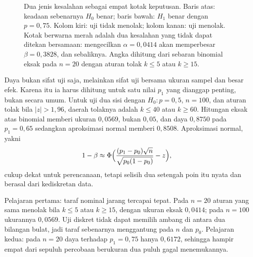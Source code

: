 \begin{figure}[htbp]
\centering
{}
\caption{Dua jenis kesalahan sebagai empat kotak keputusan. Baris atas: keadaan
sebenarnya $H_0$ benar; baris bawah: $H_1$ benar dengan $p=0{,}75$. Kolom kiri: uji
tidak menolak; kolom kanan: uji menolak. Kotak berwarna merah adalah dua kesalahan yang
tidak dapat ditekan bersamaan: mengecilkan $\alpha=0{,}0414$ akan memperbesar
$\beta=0{,}3828$, dan sebaliknya. Angka dihitung dari sebaran binomial eksak pada
$n=20$ dengan aturan tolak $k\le5$ atau $k\ge15$.}
\label{fig:dua-galat}
\end{figure}

Daya bukan sifat uji saja, melainkan sifat uji bersama ukuran sampel dan besar efek.
Karena itu ia harus dihitung untuk satu nilai $p_1$ yang dianggap penting, bukan
secara umum. Untuk uji dua sisi dengan $H_0\colon p=0{,}5$, $n=100$, dan aturan tolak
bila $|z|>1{,}96$, daerah tolaknya adalah $k\le40$ atau $k\ge60$. Hitungan eksak atas
binomial memberi ukuran $0{,}0569$, bukan $0{,}05$, dan daya $0{,}8750$ pada
$p_1=0{,}65$ sedangkan aproksimasi normal memberi $0{,}8508$. Aproksimasi normal,
yakni
\[
1-\beta\approx\Phi\Bigl(\frac{(p_1-p_0)\sqrt n}{\sqrt{p_0(1-p_0)}}-z\Bigr),
\]
cukup dekat untuk perencanaan, tetapi selisih dua setengah poin itu nyata dan berasal
dari kediskretan data.

Pelajaran pertama: taraf nominal jarang tercapai tepat. Pada $n=20$ aturan yang sama
menolak bila $k\le5$ atau $k\ge15$, dengan ukuran eksak $0{,}0414$; pada $n=100$
ukurannya $0{,}0569$. Uji diskret tidak dapat memilih ambang di antara dua bilangan
bulat, jadi taraf sebenarnya menggantung pada $n$ dan $p_0$. Pelajaran kedua: pada
$n=20$ daya terhadap $p_1=0{,}75$ hanya $0{,}6172$, sehingga hampir empat dari sepuluh
percobaan berukuran dua puluh gagal menemukannya.

